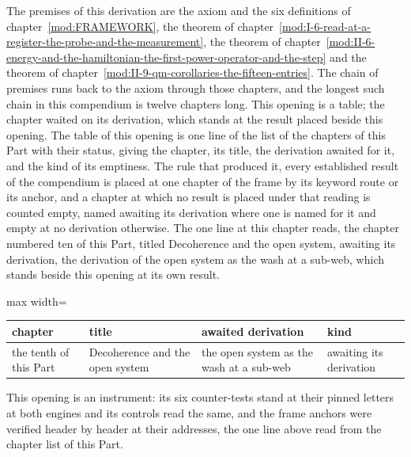 \begin{chproof}[instrument]
The premises of this derivation are the axiom and the six definitions of chapter~\ref{mod:FRAMEWORK}, the theorem of chapter~\ref{mod:I-6-read-at-a-register-the-probe-and-the-measurement}, the theorem of chapter~\ref{mod:II-6-energy-and-the-hamiltonian-the-first-power-operator-and-the-step} and the theorem of chapter~\ref{mod:II-9-qm-corollaries-the-fifteen-entries}. The chain of premises runs back to the axiom through those chapters, and the longest such chain in this compendium is twelve chapters long.
This opening is a table; the chapter waited on its derivation, which stands at the result placed beside this opening.
The table of this opening is one line of the list of the chapters of this Part with their status, giving the chapter, its title, the derivation awaited for it, and the kind of its emptiness. The rule that produced it, every established result of the compendium is placed at one chapter of the frame by its keyword route or its anchor, and a chapter at which no result is placed under that reading is counted empty, named awaiting its derivation where one is named for it and empty at no derivation otherwise. The one line at this chapter reads, the chapter numbered ten of this Part, titled Decoherence and the open system, awaiting its derivation, the derivation of the open system as the wash at a sub-web, which stands beside this opening at its own result.
\begin{center}\begin{adjustbox}{max width=\linewidth}\begin{tabular}{llll}\hline chapter & title & awaited derivation & kind \\ \hline the tenth of this Part & Decoherence and the open system & the open system as the wash at a sub-web & awaiting its derivation \\ \hline \end{tabular}\end{adjustbox}\end{center}
This opening is an instrument: its six counter-tests stand at their pinned letters at both engines and its controls read the same, and the frame anchors were verified header by header at their addresses, the one line above read from the chapter list of this Part.
\end{chproof}

